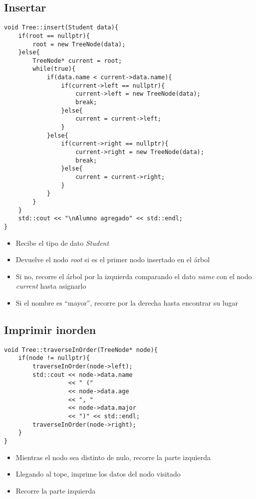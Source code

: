 \documentclass[11pt]{article}
\begin{document}
\subsection{Insertar}
\label{sec:org319dfca}
\begin{verbatim}
void Tree::insert(Student data){
    if(root == nullptr){
        root = new TreeNode(data);
    }else{
        TreeNode* current = root;
        while(true){
            if(data.name < current->data.name){
                if(current->left == nullptr){
                    current->left = new TreeNode(data);
                    break;
                }else{
                    current = current->left;
                }
            }else{
                if(current->right == nullptr){
                    current->right = new TreeNode(data);
                    break;
                }else{
                    current = current->right;
                }
            }
        }
    }
    std::cout << "\nAlumno agregado" << std::endl;
}
\end{verbatim}
\begin{itemize}
\item Recibe el tipo de dato \emph{Student}
\item Devuelve el nodo \emph{root} si es el primer nodo
insertado en el árbol
\item Si no, recorre el árbol por la izquierda
comparando el dato \emph{name} con el nodo \emph{current}
hasta asignarlo
\item Si el nombre es ``mayor'', recorre por la derecha
hasta encontrar su lugar
\end{itemize}
\subsection{Imprimir inorden}
\label{sec:orgef47a5d}
\begin{verbatim}
void Tree::traverseInOrder(TreeNode* node){
    if(node != nullptr){
        traverseInOrder(node->left);
        std::cout << node->data.name
                  << " ("
                  << node->data.age
                  << ", "
                  << node->data.major
                  << ")" << std::endl;
        traverseInOrder(node->right);
    }
}
\end{verbatim}
\begin{itemize}
\item Mientras el nodo sea distinto de nulo, recorre
la parte izquierda
\item Llegando al tope, imprime los datos del nodo visitado
\item Recorre la parte izquierda
\end{itemize}
\end{document}
